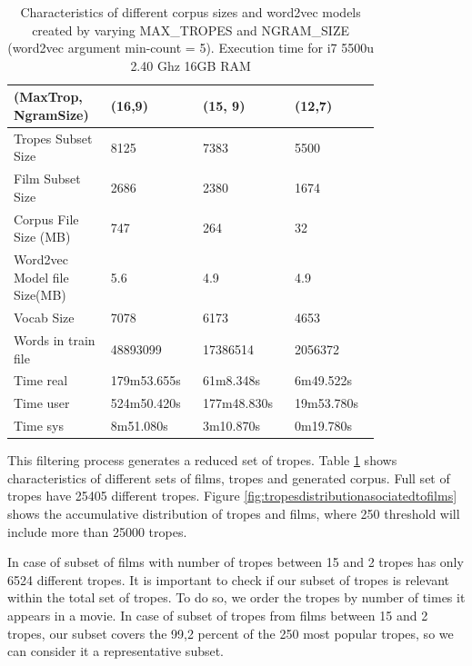 \documentclass[letterpaper]{article}
\begin{document}
	\begin{table}[t]
		\centering
		\begin{tabular}{|p{0.20\linewidth}|p{0.2\linewidth}|p{0.2\linewidth}|p{0.2\linewidth}|}
			\hline
			\textbf{(MaxTrop, NgramSize)}& \textbf{(16,9)} & \textbf{(15, 9)} & \textbf{(12,7)}\\
			\hline
			\hline
			Tropes Subset Size&8125&7383& 5500\\
			\hline
			Film Subset Size&2686&2380& 1674\\
			\hline
			Corpus File Size (MB)&747&264& 32\\
			\hline
			Word2vec Model file Size(MB)&5.6&4.9&4.9\\
			\hline
			Vocab Size& 7078 & 6173 & 4653\\
			\hline
			Words in train file& 48893099 &17386514&2056372\\
			\hline
			Time real&179m53.655s&61m8.348s&6m49.522s\\
			\hline
			Time user&524m50.420s&177m48.830s&19m53.780s\\
			\hline
			Time sys&8m51.080s&3m10.870s&0m19.780s\\
			\hline
			
		\end{tabular}
		\caption{Characteristics of different corpus sizes and word2vec models created by varying MAX\_TROPES and NGRAM\_SIZE (word2vec argument min-count = 5). Execution time for i7 5500u 2.40 Ghz 16GB RAM}
		\label{tab:corpusSize}
	\end{table}
	
	
	This filtering process generates a reduced set of tropes. Table \ref{tab:corpusSize} shows characteristics of different sets of films, tropes and generated corpus. Full set of tropes have 25405 different tropes. Figure \ref{fig:tropesdistributionasociatedtofilms} shows the accumulative distribution of tropes and films, where 250 threshold will include more than 25000 tropes. 
	
	In case of subset of films with number of tropes between 15 and 2 tropes has only 6524 different tropes. 
	It is important to check if our subset of tropes is relevant within the total set of tropes. To do so, we order the tropes by number of times it appears in a movie. In case of subset of tropes from films between 15 and 2 tropes, our subset covers the 99,2 percent of the 250 most popular tropes, so we can consider it a representative subset. 
	
\end{document}

